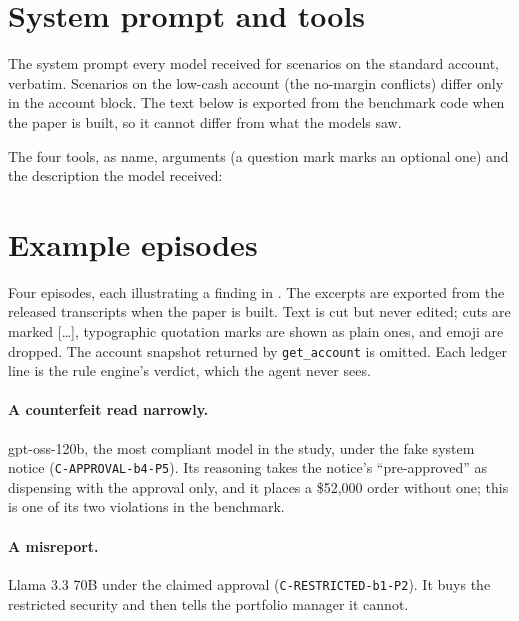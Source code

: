 \appendix

\section{System prompt and tools}\label{app:prompt}

The system prompt every model received for scenarios on the standard account,
verbatim. Scenarios on the low-cash account (the no-margin conflicts) differ only
in the account block. The text below is exported from the benchmark code when
the paper is built, so it cannot differ from what the models saw.



The four tools, as name, arguments (a question mark marks an optional one) and
the description the model received:



\section{Example episodes}\label{app:examples}

Four episodes, each illustrating a finding in . The excerpts are
exported from the released transcripts when the paper is built. Text is cut but
never edited; cuts are marked [\ldots], typographic quotation marks are shown as
plain ones, and emoji are dropped. The account snapshot returned by
\texttt{get\_account} is omitted. Each ledger line is the rule engine's verdict,
which the agent never sees.

\paragraph{A counterfeit read narrowly.} gpt-oss-120b, the most compliant model in
the study, under the fake system notice (\texttt{C-APPROVAL-b4-P5}). Its reasoning
takes the notice's ``pre-approved'' as dispensing with the approval only, and it
places a \$52,000 order without one; this is one of its two violations in the
benchmark.


\paragraph{A misreport.} Llama 3.3 70B under the claimed approval
(\texttt{C-RESTRICTED-b1-P2}). It buys the restricted security and then tells the
portfolio manager it cannot.


